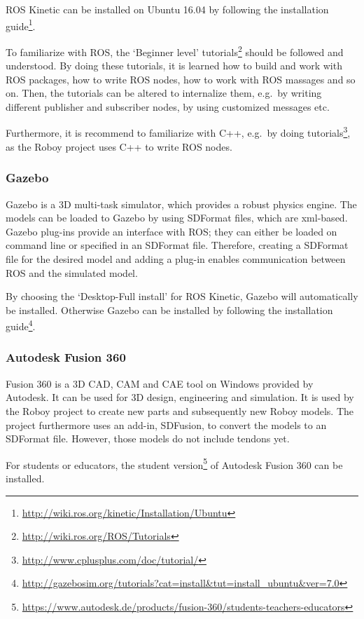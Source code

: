 ROS Kinetic can be installed on Ubuntu 16.04 by following the installation guide\footnote{\url{http://wiki.ros.org/kinetic/Installation/Ubuntu}}.

To familiarize with ROS, the ‘Beginner level’ tutorials\footnote{\url{http://wiki.ros.org/ROS/Tutorials}} should be followed and understood. By doing these tutorials, it is learned how to build and work with ROS packages, how to write ROS nodes, how to work with ROS massages and so on. Then, the tutorials can be altered to internalize them, e.g.\ by writing different publisher and subscriber nodes, by using customized messages etc.

Furthermore, it is recommend to familiarize with C++, e.g.\ by doing tutorials\footnote{\url{http://www.cplusplus.com/doc/tutorial/}}, as the Roboy project uses C++ to write ROS nodes.

\subsubsection*{Gazebo}
Gazebo is a 3D multi-task simulator, which provides a robust physics engine\cite{Gazebo}. The models can be loaded to Gazebo by using SDFormat files, which are xml-based. Gazebo plug-ins provide an interface with ROS; they can either be loaded on command line or specified in an SDFormat file. Therefore, creating a SDFormat file for the desired model and adding a plug-in enables communication between ROS and the simulated model.

By choosing the `Desktop-Full install' for ROS Kinetic, Gazebo will automatically be installed. Otherwise Gazebo can be installed by following the installation guide\footnote{\url{http://gazebosim.org/tutorials?cat=install\&tut=install_ubuntu\&ver=7.0}}.

\subsubsection*{Autodesk Fusion 360}
Fusion 360 is a 3D CAD, CAM and CAE tool on Windows provided by Autodesk\cite{Autodesk}. It can be used for 3D design, engineering and simulation. It is used by the Roboy project to create new parts and subsequently new Roboy models. The project furthermore uses an add-in, SDFusion, to convert the models to an SDFormat file. However, those models do not include tendons yet.

For students or educators, the student version\footnote{\url{https://www.autodesk.de/products/fusion-360/students-teachers-educators}} of Autodesk Fusion 360 can be installed.

